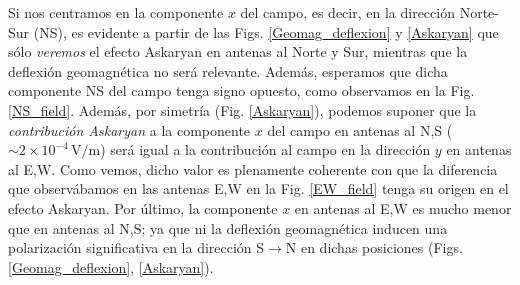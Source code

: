 \documentclass[11 pt, a4paper]{article} %
\numberwithin{equation}{section}
\numberwithin{figure}{section}
\numberwithin{table}{section}
\begin{document}
Si nos centramos en la componente $x$ del campo, es decir, en la dirección Norte-Sur (NS), es evidente a partir de las Figs. \ref{Geomag_deflexion} y \ref{Askaryan} que sólo \textit{veremos} el efecto Askaryan en antenas al Norte y Sur, mientras que la deflexión geomagnética no será relevante. Además, esperamos que dicha componente NS del campo tenga signo opuesto, como observamos en la Fig. \ref{NS_field}. Además, por simetría (Fig. \ref{Askaryan}), podemos suponer que la \textit{contribución Askaryan} a la componente $x$ del campo en antenas al N,S ($\sim 2\times10^{-4}\,\mathrm{V/m}$) será igual a la contribución al campo en la dirección $y$ en antenas al E,W. Como vemos, dicho valor es plenamente coherente con que la diferencia que observábamos en las antenas E,W en la Fig. \ref{EW_field} tenga su origen en el efecto Askaryan. Por último, la componente $x$ en antenas al E,W es mucho menor que en antenas al N,S; ya que ni la deflexión geomagnética inducen una polarización significativa en la dirección S$\rightarrow$N en dichas posiciones (Figs. \ref{Geomag_deflexion}, \ref{Askaryan}).
\end{document}
